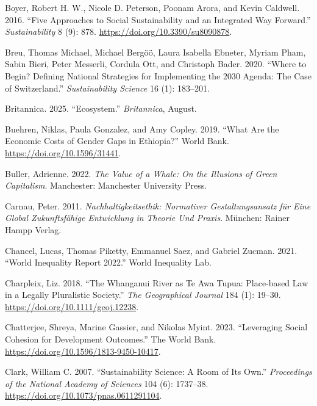 \documentclass[
  a4paper,
  openany]{book}
\newlength{\cslhangindent}
\newenvironment{CSLReferences}[2] %
 {\begin{list}{}{%
  \setlength{\itemindent}{0pt}
  \setlength{\leftmargin}{0pt}
  \setlength{\parsep}{0pt}
  \ifodd #1
   \setlength{\leftmargin}{\cslhangindent}
   \setlength{\itemindent}{-1\cslhangindent}
  \fi
  \setlength{\itemsep}{#2\baselineskip}}}
 {\end{list}}
\begin{document}
\begin{CSLReferences}{1}{0}
Boyer, Robert H. W., Nicole D. Peterson, Poonam Arora, and Kevin
Caldwell. 2016. {``Five {Approaches} to {Social Sustainability} and an
{Integrated Way Forward}.''} \emph{Sustainability} 8 (9): 878.
\url{https://doi.org/10.3390/su8090878}.

Breu, Thomas Michael, Michael Bergöö, Laura Isabella Ebneter, Myriam
Pham, Sabin Bieri, Peter Messerli, Cordula Ott, and Christoph Bader.
2020. {``Where to Begin? {Defining} National Strategies for Implementing
the 2030 {Agenda}: The Case of {Switzerland}.''} \emph{Sustainability
Science} 16 (1): 183--201.

Britannica. 2025. {``Ecosystem.''} \emph{Britannica}, August.

Buehren, Niklas, Paula Gonzalez, and Amy Copley. 2019. {``What {Are} the
{Economic Costs} of {Gender Gaps} in {Ethiopia}?''} World Bank.
\url{https://doi.org/10.1596/31441}.

Buller, Adrienne. 2022. \emph{The {Value} of a {Whale}: {On} the
{Illusions} of {Green Capitalism}}. Manchester: Manchester University
Press.

Carnau, Peter. 2011. \emph{Nachhaltigkeitsethik: {Normativer
Gestaltungsansatz} f{ü}r Eine Global Zukunftsf{ä}hige {Entwicklung} in
{Theorie} Und {Praxis}}. M{ü}nchen: Rainer Hampp Verlag.

Chancel, Lucas, Thomas Piketty, Emmanuel Saez, and Gabriel Zucman. 2021.
{``World {Inequality Report} 2022.''} World Inequality Lab.

Charpleix, Liz. 2018. {``The {Whanganui River} as {Te Awa Tupua}:
{Place-based} Law in a Legally Pluralistic Society.''} \emph{The
Geographical Journal} 184 (1): 19--30.
\url{https://doi.org/10.1111/geoj.12238}.

Chatterjee, Shreya, Marine Gassier, and Nikolas Myint. 2023.
{``Leveraging {Social Cohesion} for {Development Outcomes}.''} The World
Bank. \url{https://doi.org/10.1596/1813-9450-10417}.

Clark, William C. 2007. {``Sustainability {Science}: {A} Room of Its
Own.''} \emph{Proceedings of the National Academy of Sciences} 104 (6):
1737--38. \url{https://doi.org/10.1073/pnas.0611291104}.


\end{CSLReferences}
\end{document}
